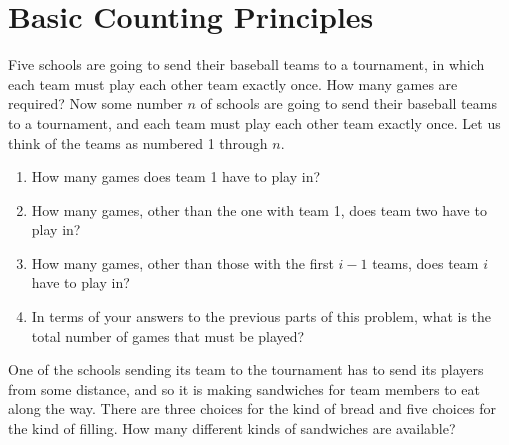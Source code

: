 \section{Basic Counting Principles}

\bp
\itemm Five schools are going to send their baseball teams to a
tournament, in which each team must play each other team
exactly once.  How many games are
required?\label{fiveteamtournament}
\iteme Now some number $n$ of schools are going to send their
baseball teams to a tournament, and each team must play each
other team exactly once.  Let us think of the teams as
numbered 1 through $n$.\label{baseball2}
\begin{enumerate}
\item How many games does  team 1 have to play in?
\item How many games, other than the one with team 1, does
team two have to play in?
\item How many games, other than those with the first $i-1$
teams, does team $i$ have to play in?
\item In terms of your answers to the previous parts of this
problem, what is the total number of games that must be played?
\end{enumerate}

\iteme One of the schools sending its team to the tournament
has to send its players from some distance, and so it is
making sandwiches for team members to eat along the way. 
There are three choices for the kind of bread and five choices
for the kind of filling.   How many different kinds of
sandwiches are available? \label{basicsandwiches}

